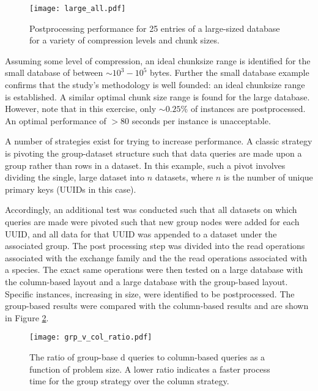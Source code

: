 \begin{figure}
  \begin{center}
    \texttt{[image: large\_all.pdf]}
    \caption[]{
      \label{fig:large_db}
      Postprocessing performance for 25 entries of a large-sized database for a
      variety of compression levels and chunk sizes.}
  \end{center}
\end{figure}

Assuming some level of compression, an ideal chunksize range is identified for
the small database of between $\sim 10^3 - 10^5$ bytes. Further the small
database example confirms that the study's methodology is well founded: an ideal
chunksize range is established. A similar optimal chunk size range is found for
the large database. However, note that in this exercise, only $\sim 0.25\%$ of
instances are postprocessed. An optimal performance of $> 80$ seconds per
instance is unacceptable.

A number of strategies exist for trying to increase performance. A classic
strategy is pivoting the group-dataset structure such that data queries are made
upon a group rather than rows in a dataset. In this example, such a pivot
involves dividing the single, large dataset into $n$ datasets, where $n$ is the
number of unique primary keys (UUIDs in this case). 

Accordingly, an additional test was conducted such that all datasets on which
queries are made were pivoted such that new group nodes were added for each
UUID, and all data for that UUID was appended to a dataset under the associated
group. The post processing step was divided into the read operations associated
with the exchange family and the the read operations associated with a
species. The exact same operations were then tested on a large database with the
column-based layout and a large database with the group-based layout. Specific
instances, increasing in size, were identified to be postprocessed. The
group-based results were compared with the column-based results and are shown in
Figure \ref{fig:col_grp}.

\begin{figure}
  \begin{center}
    \texttt{[image: grp\_v\_col\_ratio.pdf]}
    \caption[]{
      \label{fig:col_grp}
      The ratio of group-base d queries to column-based queries as a function of
      problem size. A lower ratio indicates a faster process time for the group
      strategy over the column strategy.}
  \end{center}
\end{figure}

